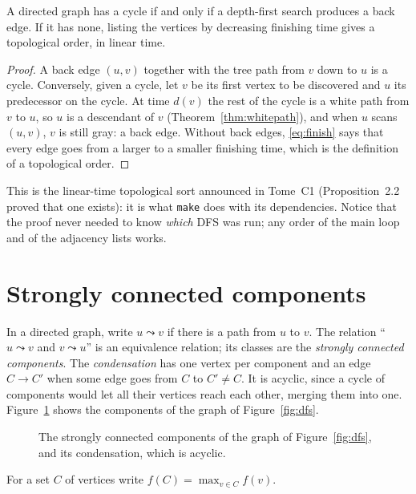 \begin{theorem}\label{thm:cycle}
A directed graph has a cycle if and only if a depth-first search produces a back edge. If it has none, listing the vertices by decreasing finishing time gives a topological order,
in linear time.
\end{theorem}
\begin{proof}
A back edge $(u,v)$ together with the tree path from $v$ down to $u$ is a cycle. Conversely, given a cycle, let $v$ be its first vertex to be discovered and $u$ its predecessor on the cycle.
At time $d(v)$ the rest of the cycle is a white path from $v$ to $u$, so $u$ is a descendant of $v$ (Theorem~\ref{thm:whitepath}), and when $u$ scans $(u,v)$, $v$ is still gray: a back edge.
Without back edges, \eqref{eq:finish} says that every edge goes from a larger to a smaller finishing time, which is the definition of a topological order.
\end{proof}

This is the linear-time topological sort announced in Tome~C1 (Proposition~2.2 proved that one exists): it is what \texttt{make} does with its dependencies. Notice that
the proof never needed to know \emph{which} DFS was run; any order of the main loop and of the adjacency lists works.

\section{Strongly connected components}\label{sec:scc}

In a directed graph, write $u\leadsto v$ if there is a path from $u$ to $v$. The relation ``$u\leadsto v$ and $v\leadsto u$'' is an equivalence relation; its classes are the
\emph{strongly connected components}. The \emph{condensation} has one vertex per component and an edge $C\to C'$ when some edge goes from $C$ to $C'\ne C$. It is acyclic, since a cycle of
components would let all their vertices reach each other, merging them into one. Figure~\ref{fig:condensation} shows the components of the graph of Figure~\ref{fig:dfs}.

\begin{figure}[ht]
\centering
{}
\caption{The strongly connected components of the graph of Figure~\ref{fig:dfs}, and its condensation, which is acyclic.}
\label{fig:condensation}
\end{figure}

For a set $C$ of vertices write $f(C)=\max_{v\in C}f(v)$.

